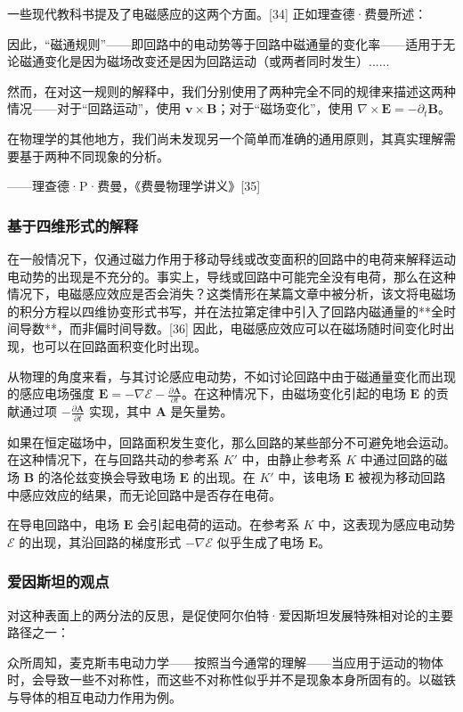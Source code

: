 一些现代教科书提及了电磁感应的这两个方面。[34] 正如理查德·费曼所述：

因此，“磁通规则”——即回路中的电动势等于回路中磁通量的变化率——适用于无论磁通变化是因为磁场改变还是因为回路运动（或两者同时发生）......  

然而，在对这一规则的解释中，我们分别使用了两种完全不同的规律来描述这两种情况——对于“回路运动”，使用 \(\mathbf{v} \times \mathbf{B}\)；对于“磁场变化”，使用 \(\nabla \times \mathbf{E} = -\partial_t \mathbf{B}\)。  

在物理学的其他地方，我们尚未发现另一个简单而准确的通用原则，其真实理解需要基于两种不同现象的分析。  

——理查德·P·费曼，《费曼物理学讲义》[35]
\subsubsection{基于四维形式的解释}
在一般情况下，仅通过磁力作用于移动导线或改变面积的回路中的电荷来解释运动电动势的出现是不充分的。事实上，导线或回路中可能完全没有电荷，那么在这种情况下，电磁感应效应是否会消失？这类情形在某篇文章中被分析，该文将电磁场的积分方程以四维协变形式书写，并在法拉第定律中引入了回路内磁通量的**全时间导数**，而非偏时间导数。[36] 因此，电磁感应效应可以在磁场随时间变化时出现，也可以在回路面积变化时出现。

从物理的角度来看，与其讨论感应电动势，不如讨论回路中由于磁通量变化而出现的感应电场强度 \(\mathbf{E} = -\nabla \mathcal{E} - \frac{\partial \mathbf{A}}{\partial t}\)。在这种情况下，由磁场变化引起的电场 \(\mathbf{E}\) 的贡献通过项 \(-\frac{\partial \mathbf{A}}{\partial t}\) 实现，其中 \(\mathbf{A}\) 是矢量势。

如果在恒定磁场中，回路面积发生变化，那么回路的某些部分不可避免地会运动。在这种情况下，在与回路共动的参考系 \(K'\) 中，由静止参考系 \(K\) 中通过回路的磁场 \(\mathbf{B}\) 的洛伦兹变换会导致电场 \(\mathbf{E}\) 的出现。在 \(K'\) 中，该电场 \(\mathbf{E}\) 被视为移动回路中感应效应的结果，而无论回路中是否存在电荷。

在导电回路中，电场 \(\mathbf{E}\) 会引起电荷的运动。在参考系 \(K\) 中，这表现为感应电动势 \(\mathcal{E}\) 的出现，其沿回路的梯度形式 \(-\nabla \mathcal{E}\) 似乎生成了电场 \(\mathbf{E}\)。
\subsubsection{爱因斯坦的观点}
对这种表面上的两分法的反思，是促使阿尔伯特·爱因斯坦发展特殊相对论的主要路径之一：

众所周知，麦克斯韦电动力学——按照当今通常的理解——当应用于运动的物体时，会导致一些不对称性，而这些不对称性似乎并不是现象本身所固有的。以磁铁与导体的相互电动力作用为例。

